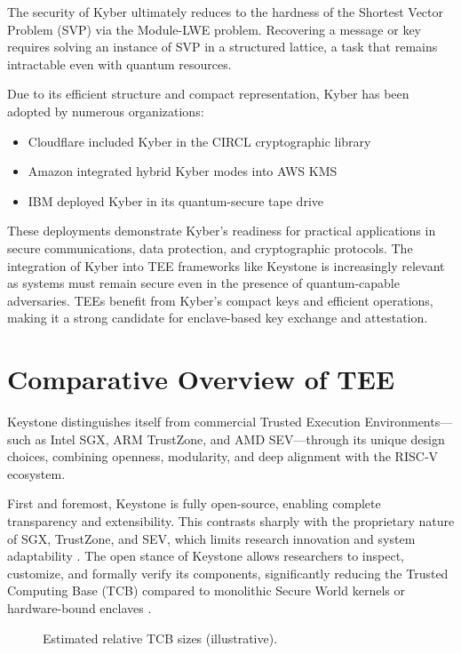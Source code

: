 The security of Kyber ultimately reduces to the hardness of the Shortest Vector Problem (SVP) via the Module-LWE problem. Recovering a message or key requires solving an instance of SVP in a structured lattice, a task that remains intractable even with quantum resources\cite{kyber2021}. %

Due to its efficient structure and compact representation, Kyber has been adopted by numerous organizations:
\begin{itemize}
    \item Cloudflare included Kyber in the CIRCL cryptographic library
    \item Amazon integrated hybrid Kyber modes into AWS KMS
    \item IBM deployed Kyber in its quantum-secure tape drive
\end{itemize} %
These deployments demonstrate Kyber’s readiness for practical applications in secure communications, data protection, and cryptographic protocols. 
The integration of Kyber into TEE frameworks like Keystone is increasingly relevant as systems must remain secure even in the presence of quantum-capable adversaries. TEEs benefit from Kyber’s compact keys and efficient operations, making it a strong candidate for enclave-based key exchange and attestation.

\section{Comparative Overview of TEE}
\label{sec:comparison_tees}

Keystone distinguishes itself from commercial Trusted Execution Environments—such as Intel SGX, ARM TrustZone, and AMD SEV—through its unique design choices, combining openness, modularity, and deep alignment with the RISC‑V ecosystem.

First and foremost, Keystone is fully open-source, enabling complete transparency and extensibility. This contrasts sharply with the proprietary nature of SGX, TrustZone, and SEV, which limits research innovation and system adaptability \cite{turn0search0}. The open stance of Keystone allows researchers to inspect, customize, and formally verify its components, significantly reducing the Trusted Computing Base (TCB) compared to monolithic Secure World kernels or hardware-bound enclaves \cite{turn0search0}.

\begin{figure}[htbp]
\centering
{}
\caption{Estimated relative TCB sizes (illustrative).}
\label{fig:tcb-size}
\end{figure}


